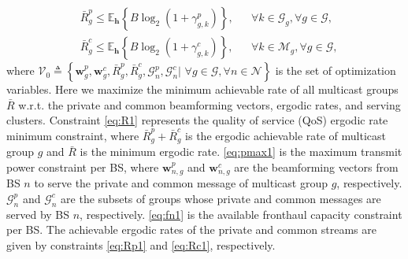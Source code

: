 \documentclass[12pt,draftcls,onecolumn]{IEEEtran}
\DeclarePairedDelimiter\normV{\lVert}{\rVert}
\theoremstyle{remark}
\theoremstyle{definition}
\begin{document}
{\begin{subequations}
\begin{align}
		& \bar{R}_{g}^{p} \leq \mathbb{E}_{\mathbf{h}}\left\lbrace B\log_2(1+\gamma_{g,k}^p)\right\rbrace, &&\forall k \in \mathcal{G}_g, \forall g \in \mathcal{G}, \label{eq:Rp1} \\	
		& \bar{R}_{g}^{c} \leq \mathbb{E}_{\mathbf{h}}\left\lbrace B\log_2(1+\gamma_{g,k}^c)\right\rbrace, &&\forall k \in \mathcal{M}_g, \forall g \in \mathcal{G}, \label{eq:Rc1}
	\end{align}
\end{subequations}  
where $\mathcal{V}_0 \triangleq \left\lbrace \mathbf{w}_{g}^p, \mathbf{w}_{g}^c, \bar{R}_{g}^{p}, \bar{R}_{g}^{c}, \mathcal{G}_n^p, \mathcal{G}_n^c|\,\, \forall g \in \mathcal{G}, \forall n \in \mathcal{N}\right\rbrace$ is the set of optimization variables. Here we maximize the minimum achievable rate of all multicast groups $\bar{R}$ w.r.t. the private and common beamforming vectors, ergodic rates, and serving clusters. Constraint \eqref{eq:R1} represents the quality of service (QoS) ergodic rate minimum constraint, where $\bar{R}_g^p + \bar{R}_g^c$ is the ergodic achievable rate of multicast group $g$ and $\bar{R}$ is the minimum ergodic rate. \eqref{eq:pmax1} is the maximum transmit power constraint per BS, where $\mathbf{w}_{n,g}^p$ and $\mathbf{w}_{n,g}^c$ are the beamforming vectors from BS $n$ to serve the private and common message of multicast group $g$, respectively. $\mathcal{G}_n^p$ and $\mathcal{G}_n^c$ are the subsets of groups whose private and common messages are served by BS $n$, respectively. \eqref{eq:fn1} is the available fronthaul capacity constraint per BS. The achievable ergodic rates of the private and common streams are given by constraints \eqref{eq:Rp1} and \eqref{eq:Rc1}, respectively. \\
}
\end{document}
